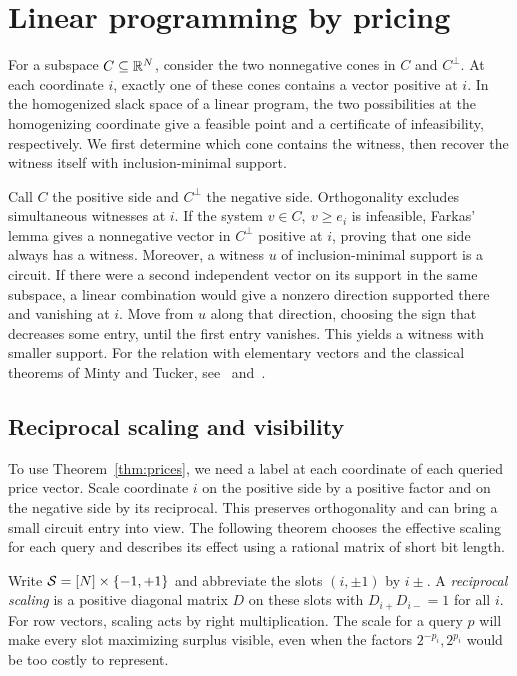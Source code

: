 \section{Linear programming by pricing}\label{sec:lp}

For a subspace \(C\subseteq\mathbb R^N\), consider the two nonnegative cones in
\(C\) and \(C^\perp\). At each coordinate \(i\), exactly one of these cones
contains a vector positive at \(i\). In the homogenized slack space of a
linear program, the two possibilities at the homogenizing coordinate
give a feasible point and a certificate of infeasibility, respectively.
We first determine which cone contains the witness, then recover the
witness itself with inclusion-minimal support.

Call \(C\) the positive side and \(C^\perp\) the negative side.
Orthogonality excludes simultaneous witnesses at \(i\). If the system
\(v\in C,\ v\ge e_i\) is infeasible, Farkas' lemma gives a nonnegative
vector in \(C^\perp\) positive at \(i\), proving that one side always
has a witness. Moreover, a witness \(u\) of inclusion-minimal support
is a circuit. If there were a second independent vector on its support
in the same subspace, a linear combination would give a nonzero
direction supported there and vanishing at \(i\). Move from \(u\)
along that direction, choosing the sign that decreases some entry,
until the first entry vanishes. This yields a witness with smaller
support. For the relation with elementary vectors and the classical
theorems of Minty and Tucker, see~\cite[Theorem~6 and its corollary]{Rock}
and~\cite{Tuc}.

\subsection{Reciprocal scaling and visibility}

To use Theorem~\ref{thm:prices}, we need a label at each coordinate of
each queried price vector. Scale coordinate \(i\) on the positive side
by a positive factor and on the negative side by its reciprocal. This
preserves orthogonality and can bring a small circuit entry into view.
The following theorem chooses the effective scaling for each query
and describes its effect using a rational matrix of short bit length.

Write \(\mathcal S=[N]\times\{-1,+1\}\) and abbreviate the slots
\((i,\pm1)\) by \(i\pm\). A \emph{reciprocal scaling} is a positive
diagonal matrix \(D\) on these slots with \(D_{i+}D_{i-}=1\) for all
\(i\). For row vectors, scaling acts by right multiplication. The
scale for a query \(p\) will make every slot maximizing surplus visible,
even when the factors \(2^{-p_i},2^{p_i}\) would be too costly to represent.

